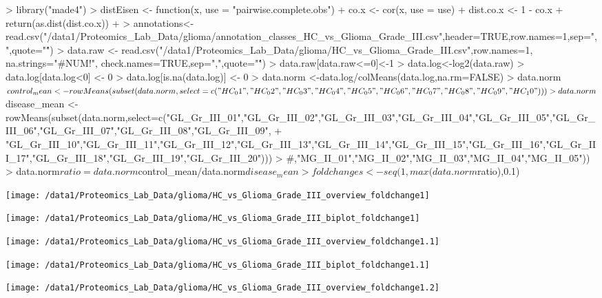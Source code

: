 \documentclass{article}
\begin{document}


\begin{Schunk}
\begin{Sinput}
>   library("made4")
> distEisen <- function(x, use = "pairwise.complete.obs") {
+   co.x <- cor(x, use = use)
+   dist.co.x <- 1 - co.x
+   return(as.dist(dist.co.x))
+ }
> annotations<-read.csv("/data1/Proteomics_Lab_Data/glioma/annotation_classes_HC_vs_Glioma_Grade_III.csv",header=TRUE,row.names=1,sep=",",quote="\'")
> data.raw <- read.csv("/data1/Proteomics_Lab_Data/glioma/HC_vs_Glioma_Grade_III.csv",row.names=1, na.strings="#NUM!", check.names=TRUE,sep=",",quote="\'")
> data.raw[data.raw<=0]<-1
> data.log<-log2(data.raw)
> data.log[data.log<0] <- 0
> data.log[is.na(data.log)] <- 0
> data.norm <-data.log/colMeans(data.log,na.rm=FALSE)
> data.norm$control_mean <- rowMeans(subset(data.norm,select=c("HC_01","HC_02","HC_03","HC_04","HC_05","HC_06","HC_07","HC_08","HC_09","HC_10")))
> data.norm$disease_mean <- rowMeans(subset(data.norm,select=c("GL_Gr_III_01","GL_Gr_III_02","GL_Gr_III_03","GL_Gr_III_04","GL_Gr_III_05","GL_Gr_III_06","GL_Gr_III_07","GL_Gr_III_08","GL_Gr_III_09",
+ "GL_Gr_III_10","GL_Gr_III_11","GL_Gr_III_12","GL_Gr_III_13","GL_Gr_III_14","GL_Gr_III_15","GL_Gr_III_16","GL_Gr_III_17","GL_Gr_III_18","GL_Gr_III_19","GL_Gr_III_20")))
> #,"MG_II_01","MG_II_02","MG_II_03","MG_II_04","MG_II_05"))
> data.norm$ratio=data.norm$control_mean/data.norm$disease_mean
> foldchanges<-seq(1,max(data.norm$ratio),0.1)
\end{Sinput}
\end{Schunk}
\centerline{\texttt{[image: /data1/Proteomics\_Lab\_Data/glioma/HC\_vs\_Glioma\_Grade\_III\_overview\_foldchange1]}}

\centerline{\texttt{[image: /data1/Proteomics\_Lab\_Data/glioma/HC\_vs\_Glioma\_Grade\_III\_biplot\_foldchange1]}}

\clearpage\centerline{\texttt{[image: /data1/Proteomics\_Lab\_Data/glioma/HC\_vs\_Glioma\_Grade\_III\_overview\_foldchange1.1]}}

\centerline{\texttt{[image: /data1/Proteomics\_Lab\_Data/glioma/HC\_vs\_Glioma\_Grade\_III\_biplot\_foldchange1.1]}}

\clearpage\centerline{\texttt{[image: /data1/Proteomics\_Lab\_Data/glioma/HC\_vs\_Glioma\_Grade\_III\_overview\_foldchange1.2]}}
\end{document}
